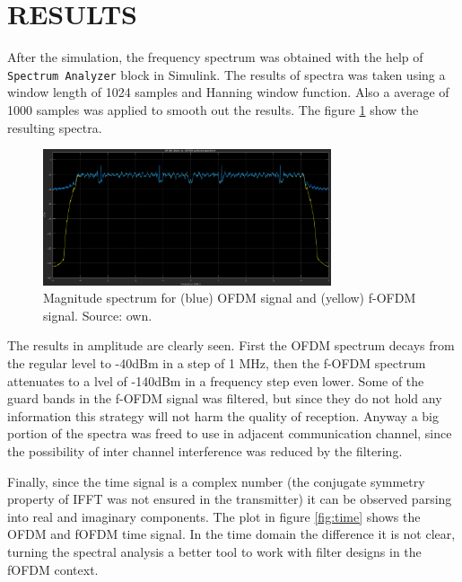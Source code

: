 \section{RESULTS}

After the simulation, the frequency spectrum was obtained with the help of \texttt{Spectrum Analyzer} block in Simulink. The results of spectra was taken using a window length of 1024 samples and Hanning window function. Also a average of 1000 samples was applied to smooth out the results. The figure \ref{fig:spectrum} show the resulting spectra.

\begin{figure}[h]
\begin{center}
\includegraphics[width=8.5cm]{images/spectrum.png}
\caption{Magnitude spectrum for (blue) OFDM signal and (yellow) f-OFDM signal. Source: own.}
\label{fig:spectrum} 
\end{center}
\end{figure}

The results in amplitude are clearly seen. First the OFDM spectrum decays from the regular level to -40dBm in a step of 1 MHz, then the f-OFDM spectrum attenuates to a lvel of -140dBm in a frequency step even lower. Some of the guard bands in the f-OFDM signal was filtered, but since they do not hold any information this strategy will not harm the quality of reception. Anyway a big portion of the spectra was freed to use in adjacent communication channel, since the possibility of inter channel interference was reduced by the filtering.

Finally, since the time signal is a complex number (the conjugate symmetry property of IFFT was not ensured in the transmitter) it can be observed parsing into real and imaginary components. The plot in figure \ref{fig:time} shows the OFDM and fOFDM time signal. In the time domain the difference it is not clear, turning the spectral analysis a better tool to work with filter designs in the fOFDM context.

